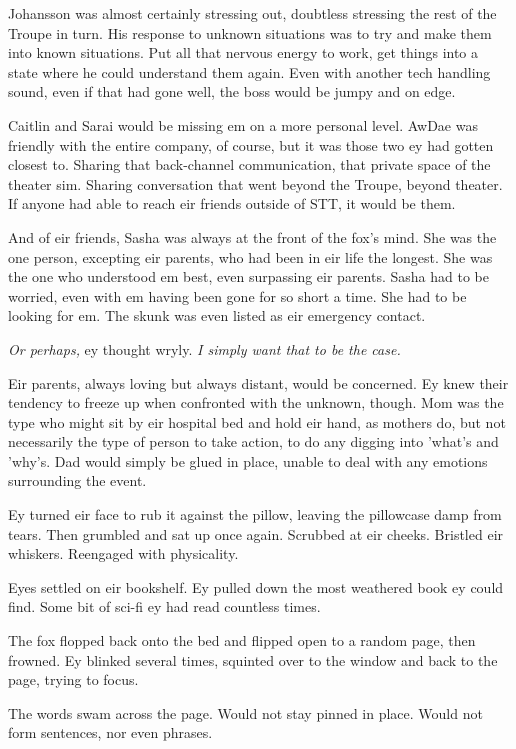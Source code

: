 Johansson was almost certainly stressing out, doubtless stressing the rest of the Troupe in turn. His response to unknown situations was to try and make them into known situations. Put all that nervous energy to work, get things into a state where he could understand them again. Even with another tech handling sound, even if that had gone well, the boss would be jumpy and on edge.

Caitlin and Sarai would be missing em on a more personal level. AwDae was friendly with the entire company, of course, but it was those two ey had gotten closest to. Sharing that back-channel communication, that private space of the theater sim. Sharing conversation that went beyond the Troupe, beyond theater. If anyone had able to reach eir friends outside of STT, it would be them.

And of eir friends, Sasha was always at the front of the fox's mind. She was the one person, excepting eir parents, who had been in eir life the longest. She was the one who understood em best, even surpassing eir parents. Sasha had to be worried, even with em having been gone for so short a time. She had to be looking for em. The skunk was even listed as eir emergency contact.

\emph{Or perhaps,} ey thought wryly. \emph{I simply want that to be the case.}

Eir parents, always loving but always distant, would be concerned. Ey knew their tendency to freeze up when confronted with the unknown, though. Mom was the type who might sit by eir hospital bed and hold eir hand, as mothers do, but not necessarily the type of person to take action, to do any digging into 'what's and 'why's. Dad would simply be glued in place, unable to deal with any emotions surrounding the event.

Ey turned eir face to rub it against the pillow, leaving the pillowcase damp from tears. Then grumbled and sat up once again. Scrubbed at eir cheeks. Bristled eir whiskers. Reengaged with physicality.

Eyes settled on eir bookshelf. Ey pulled down the most weathered book ey could find. Some bit of sci-fi ey had read countless times.

The fox flopped back onto the bed and flipped open to a random page, then frowned. Ey blinked several times, squinted over to the window and back to the page, trying to focus.

The words swam across the page. Would not stay pinned in place. Would not form sentences, nor even phrases.

